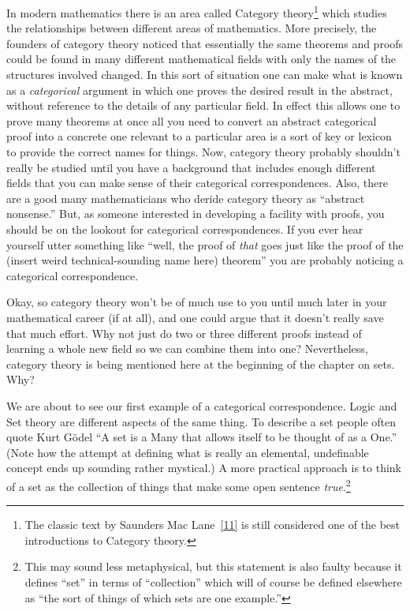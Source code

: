 \documentclass[10pt,]{book}
\theoremstyle{plain}
\theoremstyle{definition}
\theoremstyle{definition}
\numberwithin{equation}{section}
\begin{document}
    In modern mathematics there is an area called 
    Category theory\footnote{The classic text by Saunders Mac Lane~\hyperlink{macl}{[11]} 
    is still considered one of the best introductions to Category theory.\label{fn-25}}
    which studies the
    relationships between different areas of mathematics. More precisely,
    the founders of category theory noticed that essentially the same theorems
    and proofs could be found in many different mathematical fields \textemdash{} with
    only the names of the structures involved changed. In this sort of
    situation one can make what is known as a \emph{categorical} argument
    in which one proves the desired result in the abstract, without reference
    to the details of any particular field. In effect this allows one
    to prove many theorems at once \textemdash{} all you need to convert an abstract
    categorical proof into a concrete one relevant to a particular area
    is a sort of key or lexicon to provide the correct names for things.
    Now, category theory probably shouldn't really be studied until you
    have a background that includes enough different fields that you can
    make sense of their categorical correspondences. Also, there are
    a good many mathematicians who deride category theory as
    ``abstract nonsense.'' But, as someone interested in developing a facility
    with proofs, you should be on the lookout for categorical correspondences.
    If you ever hear yourself utter something like ``well, the proof of
    \emph{that} goes just like the proof of the
    (insert weird technical-sounding name here) theorem'' you are
    probably noticing a categorical correspondence.
\par

    Okay, so category theory won't be of much
    use to you until much later in your mathematical career (if at all), and
    one could argue that it doesn't really save that much effort. Why not just do two or three different
    proofs instead of learning a whole new field so we can combine
    them into one? Nevertheless, category theory is being
    mentioned here at the beginning of the chapter on sets. Why?
\par

    We are about to see our first example of a categorical correspondence.
    Logic and Set theory are different aspects of the same thing. To
    describe a set people often quote
     Kurt Gödel \textemdash{} ``A set is a Many that allows itself to be thought of as a One.'' (Note
    how the attempt at defining what is really an elemental, undefinable
    concept ends up sounding rather mystical.) A more practical approach is
    to think of a set as the collection of things that make some open sentence
    \emph{true}.\footnote{This may sound less metaphysical,
    but this statement is also faulty because it defines ``set'' in terms of ``collection'' \textemdash{} which will of course be defined elsewhere as ``the sort of things of which sets are one example.''\label{fn-26}}
\par
\end{document}
